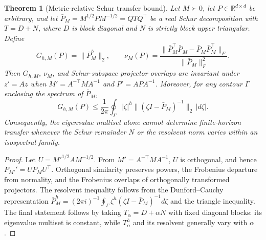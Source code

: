 \documentclass{article}
\newtheorem{theorem}{Theorem}
\newcommand{\R}{\mathbb{R}}
\begin{document}
\begin{theorem}[Metric-relative Schur transfer bound]
\label{thm:metric-schur-transfer}
Let $M\succ0$, let $P\in\R^{d\times d}$ be arbitrary, and let
$\bar P_M=M^{1/2}PM^{-1/2}=Q T Q^\top$ be a real Schur decomposition with
$T=D+N$, where $D$ is block diagonal and $N$ is strictly block upper
triangular. Define
\begin{equation}
G_{h,M}(P)=\|\bar P_M^h\|_2,
\qquad
\nu_M(P)=
\frac{\|\bar P_M^\top\bar P_M-\bar P_M\bar P_M^\top\|_F}
{\|\bar P_M\|_F^2}.
\label{eq:metric-schur-quantities}
\end{equation}
Then $G_{h,M}$, $\nu_M$, and Schur-subspace projector overlaps are invariant
under $z'=Az$ when $M'=A^{-\top}MA^{-1}$ and $P'=APA^{-1}$. Moreover, for
any contour $\Gamma$ enclosing the spectrum of $\bar P_M$,
\begin{equation}
G_{h,M}(P)
\leq \frac{1}{2\pi}\oint_\Gamma
|\zeta|^h\|(\zeta I-\bar P_M)^{-1}\|_2\,|d\zeta| .
\label{eq:schur-resolvent-bound}
\end{equation}
Consequently, the eigenvalue multiset alone cannot determine finite-horizon
transfer whenever the Schur remainder $N$ or the resolvent norm varies within
an isospectral family.
\end{theorem}

\begin{proof}
Let $U=M'^{1/2}AM^{-1/2}$. From
$M'=A^{-\top}MA^{-1}$, $U$ is orthogonal, and hence
$\bar P_{M'}'=U\bar P_MU^\top$. Orthogonal similarity preserves powers,
the Frobenius departure from normality, and the Frobenius overlaps of
orthogonally transformed projectors. The resolvent inequality follows from
the Dunford--Cauchy representation
$\bar P_M^h=(2\pi i)^{-1}\oint_\Gamma
\zeta^h(\zeta I-\bar P_M)^{-1}d\zeta$ and the triangle inequality.
The final statement follows by taking $T_\alpha=D+\alpha N$ with fixed
diagonal blocks: its eigenvalue multiset is constant, while $T_\alpha^h$
and its resolvent generally vary with $\alpha$.
\end{proof}
\end{document}
